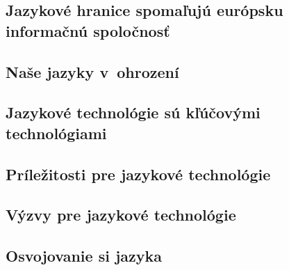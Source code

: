 \documentclass[]{../metanetpaper}
\begin{document}

\cleardoublepage


\renewcommand{\contentsname}{}
\tableofcontents



\cleardoublepage

\setcounter{page}{1}
\pagestyle{scrheadings}

\setlength\parindent{1em}
\frenchspacing

\begin{multicols}{2}



\end{multicols}

\clearpage

\begin{multicols}{2}

\subsection{Jazykové hranice spomaľujú európsku informačnú spoločnosť}

\subsection{Naše jazyky v~ohrození}

\subsection{Jazykové technológie sú kľúčovými technológiami}

\subsection{Príležitosti pre jazykové technológie}

\subsection{Výzvy pre jazykové technológie}

\subsection{Osvojovanie si jazyka}

\end{multicols}
\end{document}
